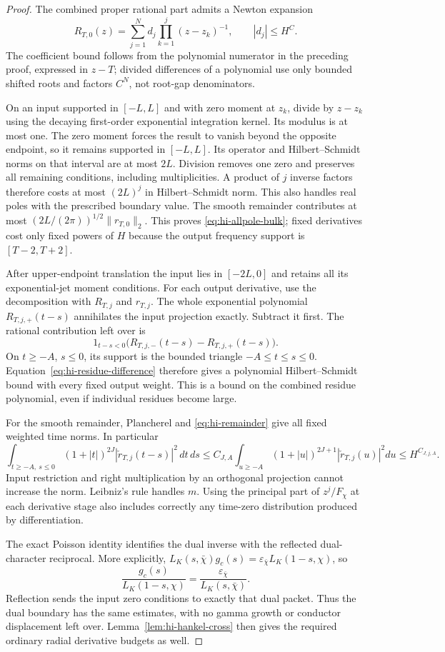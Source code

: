 \begin{proof}
The combined proper rational part admits a Newton expansion
\[
 R_{T,0}(z)=\sum_{j=1}^Nd_j\prod_{k=1}^j(z-z_k)^{-1},
 \qquad |d_j|\le H^C.
\]
The coefficient bound follows from the polynomial numerator in the
preceding proof, expressed in $z-T$; divided differences of a polynomial
use only bounded shifted roots and factors $C^N$, not root-gap
denominators.

On an input supported in $[-L,L]$ and with zero moment at $z_k$, divide
by $z-z_k$ using the decaying first-order exponential integration kernel.
Its modulus is at most one. The zero moment forces the result to vanish
beyond the opposite endpoint, so it remains supported in $[-L,L]$.
Its operator and Hilbert--Schmidt norms on that interval are at most
$2L$. Division removes one zero and preserves all remaining conditions,
including multiplicities. A product of $j$ inverse factors therefore
costs at most $(2L)^j$ in Hilbert--Schmidt norm. This also handles real
poles with the prescribed boundary value. The smooth remainder contributes
at most $(2L/(2\pi))^{1/2}\|r_{T,0}\|_2$. This proves
\eqref{eq:hi-allpole-bulk}; fixed derivatives cost only fixed powers of
$H$ because the output frequency support is $[T-2,T+2]$.

After upper-endpoint translation the input lies in $[-2L,0]$ and retains
all its exponential-jet moment conditions. For each output derivative,
use the decomposition with $R_{T,j}$ and $r_{T,j}$. The whole
exponential polynomial $R_{T,j,+}(t-s)$ annihilates the input projection
exactly. Subtract it first. The rational contribution left over is
\[
 1_{t-s<0}\bigl(R_{T,j,-}(t-s)-R_{T,j,+}(t-s)\bigr).
\]
On $t\ge-A$, $s\le0$, its support is the bounded triangle
$-A\le t\le s\le0$. Equation~\eqref{eq:hi-residue-difference}
therefore gives a polynomial Hilbert--Schmidt bound with every fixed
output weight. This is a bound on the combined residue polynomial,
even if individual residues become large.

For the smooth remainder, Plancherel and \eqref{eq:hi-remainder} give
all fixed weighted time norms. In particular
\[
 \int_{t\ge-A,\ s\le0}(1+|t|)^{2J}
              |\check r_{T,j}(t-s)|^2\,dt\,ds
 \le C_{J,A}\int_{u\ge-A}(1+|u|)^{2J+1}
              |\check r_{T,j}(u)|^2du\le H^{C_{J,j,A}}.
\]
Input restriction and right multiplication by an orthogonal projection
cannot increase the norm. Leibniz's rule handles $m$. Using the principal
part of $z^j/F_\chi$ at each derivative stage also includes correctly
any time-zero distribution produced by differentiation.

The exact Poisson identity identifies the dual inverse with the reflected
dual-character reciprocal. More explicitly,
$L_K(s,\bar\chi)g_c(s)=\varepsilon_{\bar\chi}L_K(1-s,\chi)$,
so
\[
        \frac{g_c(s)}{L_K(1-s,\chi)}
                    =\frac{\varepsilon_{\bar\chi}}{L_K(s,\bar\chi)}.
\]
Reflection sends the input zero conditions to exactly that dual packet.
Thus the dual boundary has the same estimates, with no gamma growth or
conductor displacement left over. Lemma~\ref{lem:hi-hankel-cross}
then gives the required ordinary radial derivative budgets as well.
\end{proof}

